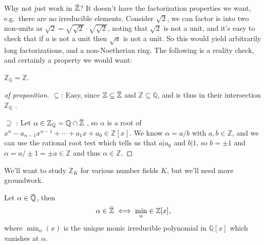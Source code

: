 \begin{remark}

Why not just work in
\(\mkern 1.5mu\overline{\mkern-1.5mu{\mathbb{Z}}\mkern-1.5mu}\mkern 1.5mu\)?
It doesn't have the factorization properties we want, e.g.~there are no
irreducible elements. Consider \(\sqrt 2\), we can factor is into two
non-units as \(\sqrt{2} = \sqrt{\sqrt 2} \cdot \sqrt{\sqrt 2}\), noting
that \(\sqrt 2\) is not a unit, and it's easy to check that if \(a\) is
not a unit then \(\sqrt a\) is not a unit. So this would yield
arbitrarily long factorizations, and a non-Noetherian ring. The
following is a reality check, and certainly a property we would want:

\end{remark}

\begin{proposition}

\({\mathbb{Z}}_{\mathbb{Q}}= {\mathbb{Z}}\).

\end{proposition}

\begin{proof}[of proposition]

\(\subseteq\): Easy, since
\({\mathbb{Z}}\subseteq \mkern 1.5mu\overline{\mkern-1.5mu{\mathbb{Z}}\mkern-1.5mu}\mkern 1.5mu\)
and \({\mathbb{Z}}\subseteq {\mathbb{Q}}\), and is thus in their
intersection \({\mathbb{Z}}_{\mathbb{Q}}\) .

\hfill\break

\(\supseteq\) : Let
\(\alpha\in {\mathbb{Z}}_{\mathbb{Q}}= {\mathbb{Q}}\cap\mkern 1.5mu\overline{\mkern-1.5mu{\mathbb{Z}}\mkern-1.5mu}\mkern 1.5mu\)
, so \(\alpha\) is a root of
\(x^n - a_{n-1}x^{n-1} + \cdots + a_1x + a_0 \in {\mathbb{Z}}[x]\). We
know \(\alpha= a/b\) with \(a,b \in {\mathbb{Z}}\), and we can use the
rational root test which tells us that \(a\mathrel{\Big|}a_0\) and
\(b\mathrel{\Big|}1\), so \(b = \pm 1\) and
\(\alpha = a/\pm 1 = \pm a \in {\mathbb{Z}}\) and thus
\(\alpha \in {\mathbb{Z}}\).

\end{proof}

\begin{remark}

We'll want to study \({\mathbb{Z}}_K\) for various number fields \(K\),
but we'll need more groundwork.

\end{remark}

\begin{proposition}

Let
\(\alpha \in \mkern 1.5mu\overline{\mkern-1.5mu{\mathbb{Q}}\mkern-1.5mu}\mkern 1.5mu\),
then
\begin{align*} \alpha\in \mkern 1.5mu\overline{\mkern-1.5mu{\mathbb{Z}}\mkern-1.5mu}\mkern 1.5mu\iff \min_ \alpha \in {\mathbb{Z}}[x], \end{align*}
where \(\min_ \alpha(x)\) is the unique monic irreducible polynomial in
\({\mathbb{Q}}[x]\) which vanishes at \(\alpha\).

\end{proposition}

